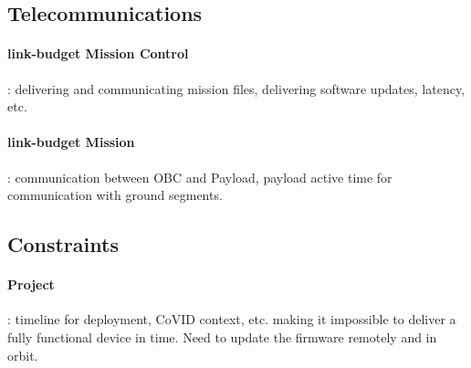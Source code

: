\subsection{Telecommunications}
\paragraph*{link-budget Mission Control}: delivering and communicating mission
files, delivering software updates, latency, etc.
\paragraph*{link-budget Mission}: communication between OBC and Payload, payload
active time for communication with ground segments.

\subsection{Constraints}
\paragraph*{Project}: timeline for deployment, CoVID context, etc. making it impossible
to deliver a fully functional device in time. Need to update the firmware remotely
and in orbit.


